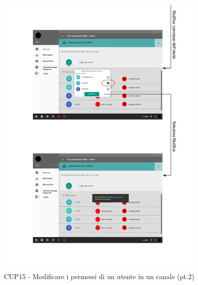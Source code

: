 \begin{figure}
	\centering
	\includegraphics[width=0.9\textwidth]{imgs/gruppo6/activities/act_cup15_modifica_permessi_utente2.pdf}
	\caption{CUP15 - Modificare i permessi di un utente in un canale (pt.2)}
	\label{fig:act-cup15-2}
\end{figure}

